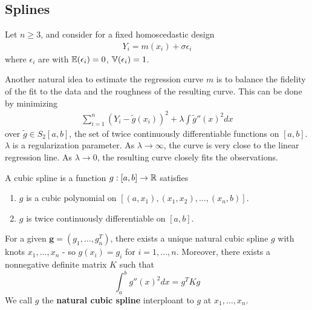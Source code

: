 \subsection{Splines}
\label{sec:splines}


Let $n \geq 3$, and consider for a fixed homoscedastic design
\begin{align}
  \label{eq:64}
  Y_{i} = m(x_{i}) + \sigma \epsilon_{i}
\end{align} where $\epsilon_{i}$ are \iid with $\E{\epsilon_{i}} = 0$,
$\Var{\epsilon_{i}} = 1$.

Another natural idea to estimate the regression curve $m$ is to
balance the fidelity of the fit to the data and the roughness of the
resulting curve.  This can be done by minimizing
\begin{align}
  \label{eq:65}
  \sum_{i=1}^{n} (Y_{i} - \tilde g(x_{i}))^{2} + \lambda \int \tilde
  g''(x)^{2} dx
\end{align} over $\tilde g \in S_{2}[a, b]$, the set of twice
continuously differentiable functions on $[a, b]$. $\lambda$ is a
regularization parameter. As $\lambda \rightarrow \infty$, the curve
is very close to the linear regression line. As $\lambda \rightarrow
0$, the resulting curve closely fits the observations.

\begin{defn}
  \label{defn:nonparametric_regression:2}
  A cubic spline is a function $g: [a, b] \rightarrow \mathbb{R}$ satisfies
  \begin{enumerate}
  \item $g$ is a cubic polynomial on $[(a, x_{1}), (x_{1}, x_{2}),
    \dots, (x_{n}, b)]$.
  \item $g$ is twice continuously differentiable on $[a, b]$.
  \end{enumerate}
\end{defn}

\begin{proposition}
  For a given $\mathbf{g} = (g_{1}, \dots, g_{n}^{T})$, there exists a unique
  natural cubic spline $g$ with knots $x_{1}, \dots, x_{n}$ - so
  $g(x_{i}) = g_{i}$ for $i = 1, \dots , n$.  Moreover, there exists a
  nonnegative definite matrix $K$ such that
  \begin{equation}
    \label{eq:59}
    \int_{a}^{b} g''(x)^{2}dx = g^{T}K g
  \end{equation}
  We call $g$ the \textbf{natural cubic spline} interploant to $g$ at
  $x_{1}, \dots, x_{n}$.
\end{proposition}

